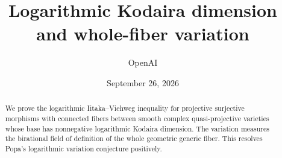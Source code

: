 \documentclass[11pt]{amsart}
\title[Logarithmic Kodaira dimension and variation]{Logarithmic Kodaira dimension and whole-fiber variation}
\author{OpenAI}
\date{September 26, 2026}
\theoremstyle{definition}
\theoremstyle{remark}
\numberwithin{equation}{section}
\begin{document}
\begin{abstract}
We prove the logarithmic Iitaka--Viehweg inequality for projective
surjective morphisms with connected fibers between smooth complex
quasi-projective varieties whose base has nonnegative logarithmic
Kodaira dimension. The variation measures the birational field of
definition of the whole geometric generic fiber. This resolves
Popa's logarithmic variation conjecture positively.
\end{abstract}
\maketitle
\tableofcontents










\end{document}
